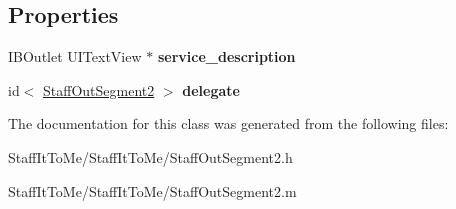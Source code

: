 \subsection*{\-Properties}
\begin{DoxyCompactItemize}
\item 
\hypertarget{interface_staff_out_segment2_a563e8ee95ae45074af75ddf99bc5d33d}{
\-I\-B\-Outlet \-U\-I\-Text\-View $\ast$ {\bfseries service\-\_\-description}}
\label{interface_staff_out_segment2_a563e8ee95ae45074af75ddf99bc5d33d}

\item 
\hypertarget{interface_staff_out_segment2_a130d5da14ce2832645a5d08af9f3ebf3}{
id$<$ \hyperlink{interface_staff_out_segment2}{\-Staff\-Out\-Segment2} $>$ {\bfseries delegate}}
\label{interface_staff_out_segment2_a130d5da14ce2832645a5d08af9f3ebf3}

\end{DoxyCompactItemize}


\-The documentation for this class was generated from the following files\-:\begin{DoxyCompactItemize}
\item 
\-Staff\-It\-To\-Me/\-Staff\-It\-To\-Me/\-Staff\-Out\-Segment2.\-h\item 
\-Staff\-It\-To\-Me/\-Staff\-It\-To\-Me/\-Staff\-Out\-Segment2.\-m\end{DoxyCompactItemize}

